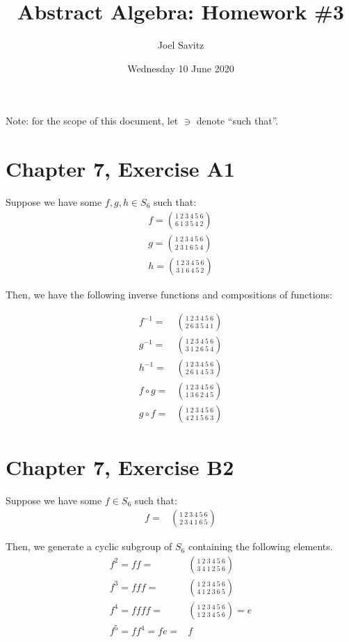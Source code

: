 \documentclass[12pt]{article}
\title{Abstract Algebra: Homework \#3}
\date{Wednesday 10 June 2020}
\author{Joel Savitz}
\begin{document}
\maketitle

Note: for the scope of this document, let $\ni$ denote ``such that''.

\section{Chapter 7, Exercise A1}

Suppose we have some $f,g,h \in S_6$ such that:
\begin{align}
	f = \binom{1\ 2\ 3\ 4\ 5\ 6}{6\ 1\ 3\ 5\ 4\ 2} \\
	g = \binom{1\ 2\ 3\ 4\ 5\ 6}{2\ 3\ 1\ 6\ 5\ 4} \\
	h = \binom{1\ 2\ 3\ 4\ 5\ 6}{3\ 1\ 6\ 4\ 5\ 2}
\end{align}

Then, we have the following inverse functions and compositions of functions:

\begin{align}
	f^{-1} = & \binom{1\ 2\ 3\ 4\ 5\ 6}{2\ 6\ 3\ 5\ 4\ 1} \\
	g^{-1} = & \binom{1\ 2\ 3\ 4\ 5\ 6}{3\ 1\ 2\ 6\ 5\ 4} \\
	h^{-1} = & \binom{1\ 2\ 3\ 4\ 5\ 6}{2\ 6\ 1\ 4\ 5\ 3} \\
	f \circ g = & \binom{1\ 2\ 3\ 4\ 5\ 6}{1\ 3\ 6\ 2\ 4\ 5} \\
	g \circ f = & \binom{1\ 2\ 3\ 4\ 5\ 6}{4\ 2\ 1\ 5\ 6\ 3}
\end{align}

\section{Chapter 7, Exercise B2}

Suppose we have some $f \in S_6$ such that:
\begin{align}
	f = & \binom{1\ 2\ 3\ 4\ 5\ 6}{2\ 3\ 4\ 1\ 6\ 5}
\end{align}

Then, we generate a cyclic subgroup of $S_6$ containing the following elements. 
\begin{align}
	f^2 = ff = & \binom{1\ 2\ 3\ 4\ 5\ 6}{3\ 4\ 1\ 2\ 5\ 6} \\
	f^3 = fff = & \binom{1\ 2\ 3\ 4\ 5\ 6}{4\ 1\ 2\ 3\ 6\ 5} \\
	f^4 = ffff = & \binom{1\ 2\ 3\ 4\ 5\ 6}{1\ 2\ 3\ 4\ 5\ 6} = e \\
	f^5 = ff^4  = fe = & f
\end{align}
\end{document}
